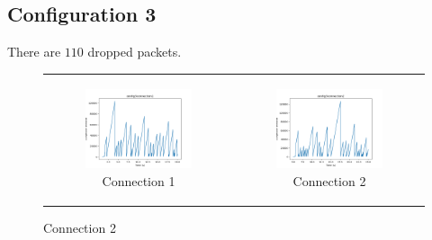 \documentclass[11pt]{article}
\begin{document}
\subsection{Configuration 3}
There are $110$ dropped packets.
\begin{figure}[H]
  \centering
  \begin{tabular}[c]{cc}
    \begin{subfigure}[c]{0.5\textwidth}
      \centering
      \includegraphics[width=\textwidth]{Q3/outputs/config3connection1.png}
      \caption{Connection 1}
    \end{subfigure}&

    \begin{subfigure}[c]{0.5\textwidth}
      \centering
      \includegraphics[width=\textwidth]{Q3/outputs/config3connection2.png}
      \caption{Connection 2}
    \end{subfigure}\\


\end{tabular}
\end{figure}
\end{document}
